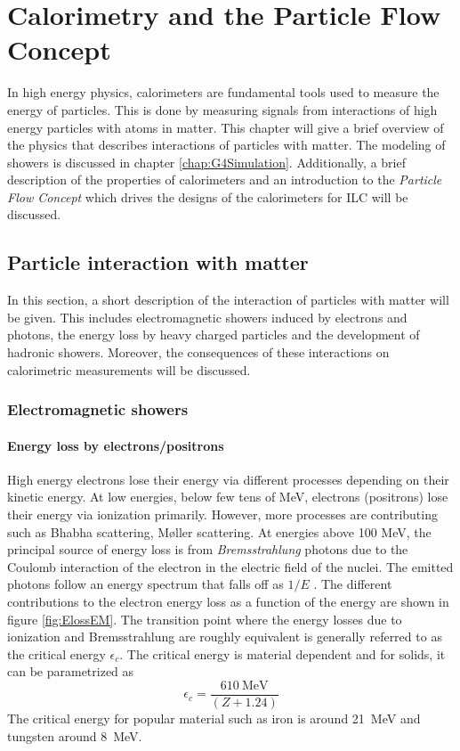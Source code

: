 \chapter{Calorimetry and the Particle Flow Concept}
\label{chap:CaloPFA}

In high energy physics, calorimeters are fundamental tools used to measure the energy of particles. This is done by measuring signals from interactions of high energy particles with atoms in matter. This chapter will give a brief overview of the physics that describes interactions of particles with matter. The modeling of showers is discussed in chapter \ref{chap:G4Simulation}. Additionally, a brief description of the properties of calorimeters and an introduction to the \textit{Particle Flow Concept} which drives the designs of the calorimeters for ILC will be discussed.

\section{Particle interaction with matter}
\label{sec:PartInter}

In this section, a short description of the interaction of particles with matter will be given. This includes electromagnetic showers induced by electrons and photons, the energy loss by heavy charged particles and the development of hadronic showers. Moreover, the consequences of these interactions on calorimetric measurements will be discussed.

\subsection{Electromagnetic showers}
\label{subsec:EMShowers}

\subsubsection{Energy loss by electrons/positrons}

High energy electrons lose their energy via different processes depending on their kinetic energy. At low energies, below few tens of MeV, electrons (positrons) lose their energy via ionization primarily. However, more processes are contributing such as Bhabha scattering, M\o{}ller scattering. At energies above 100 MeV, the principal source of energy loss is from \textit{Brems\-strah\-lung} photons due to the Coulomb interaction of the electron in the electric field of the nuclei. The emitted photons follow an energy spectrum that falls off as $1/E$ \cite{Wigmans:392793}. The different contributions to the electron energy loss as a function of the energy are shown in figure \ref{fig:ElossEM}. The transition point where the energy losses due to ionization and Bremsstrahlung are roughly equivalent is generally referred to as the critical energy $\epsilon_{c}$. The critical energy is material dependent and for solids, it can be parametrized as
\begin{equation}
  \epsilon_{c} = \frac{\SI{610}{\mega\eV}}{(Z + 1.24)}
\end{equation}
The critical energy for popular material such as iron is around \SI{21}{\mega\eV} and tungsten around \SI{8}{\mega\eV}.

